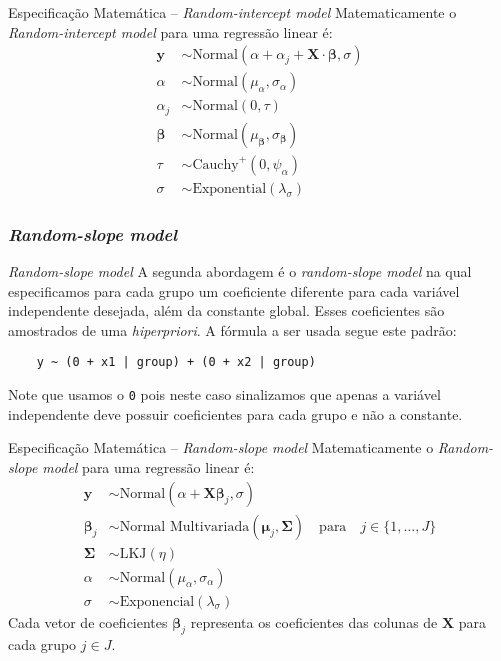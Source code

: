\begin{frame}{Especificação Matemática -- \textit{Random-intercept model}}
  Matematicamente o \textit{Random-intercept model} para uma regressão linear é:
  $$
  \begin{aligned}
  \mathbf{y} &\sim \text{Normal}\left( \alpha + \alpha_j + \mathbf{X} \cdot \boldsymbol{\beta}, \sigma \right) \\
  \alpha &\sim \text{Normal}(\mu_\alpha, \sigma_\alpha) \\
  \alpha_j &\sim \text{Normal}(0, \tau) \\
  \boldsymbol{\beta} &\sim \text{Normal}(\mu_{\boldsymbol{\beta}}, \sigma_{\boldsymbol{\beta}}) \\
  \tau &\sim \text{Cauchy}^+(0, \psi_{\alpha})\\
  \sigma &\sim \text{Exponential}(\lambda_\sigma)
  \end{aligned}
  $$
\end{frame}

\subsubsection{\textit{Random-slope model}}
\begin{frame}[fragile]{\textit{Random-slope model}}
  A segunda abordagem é o \textit{random-slope model} na qual especificamos para cada
  grupo um coeficiente diferente para cada variável independente desejada,
  além da constante global. Esses coeficientes são amostrados de uma \textit{hiperpriori}.
  \vfill
  A fórmula a ser usada segue este padrão:
  \begin{lstlisting}
    y ~ (0 + x1 | group) + (0 + x2 | group)
  \end{lstlisting}
  \vfill
  Note que usamos o \texttt{0} pois neste caso sinalizamos que apenas a variável
  independente deve possuir coeficientes para cada grupo e não a constante.
\end{frame}

\begin{frame}{Especificação Matemática -- \textit{Random-slope model}}
  Matematicamente o \textit{Random-slope model} para uma regressão linear é:
  $$
  \begin{aligned}
    \boldsymbol{y} &\sim \text{Normal}(\alpha + \mathbf{X} \boldsymbol{\beta}_{j}, \sigma) \\
    \boldsymbol{\beta}_j &\sim \text{Normal Multivariada}(\boldsymbol{\mu}_j, \boldsymbol{\Sigma})
    \quad \text{para}\quad j \in \{ 1, \dots, J \} \\
    \boldsymbol{\Sigma} &\sim \text{LKJ}(\eta) \\
    \alpha &\sim \text{Normal}(\mu_\alpha, \sigma_\alpha) \\
    \sigma &\sim \text{Exponencial}(\lambda_\sigma)
  \end{aligned}
  $$
  Cada vetor de coeficientes $\boldsymbol{\beta}_j$ representa os coeficientes
  das colunas de $\mathbf{X}$ para cada grupo $j \in J$.
\end{frame}

